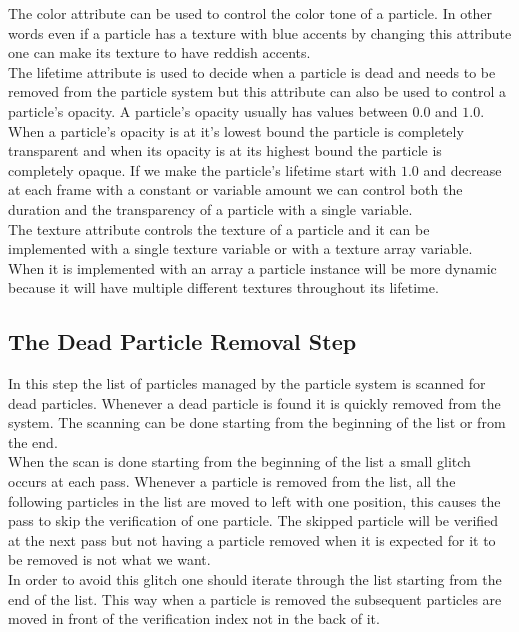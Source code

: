 The color attribute can be used to control the color tone of a particle. In other words even if a particle has a texture with blue accents by changing this attribute one can make its texture to have reddish accents.\\

The lifetime attribute is used to decide when a particle is dead and needs to be removed from the particle system but this attribute can also be used to control a particle's opacity. A particle's opacity usually has values between $0.0$ and $1.0$. When a particle's opacity is at it's lowest bound the particle is completely transparent and when its opacity is at its highest bound the particle is completely opaque. If we make the particle's lifetime start with $1.0$ and decrease at each frame with a constant or variable amount we can control both the duration and the transparency of a particle with a single variable.\\

The texture attribute controls the texture of a particle and it can be implemented with a single texture variable or with a texture array variable. When it is implemented with an array a particle instance will be more dynamic because it will have multiple different textures throughout its lifetime.\\

\newpage
\subsection{The Dead Particle Removal Step}
In this step the list of particles managed by the particle system is scanned for dead particles. Whenever a dead particle is found it is quickly removed from the system. The scanning can be done starting from the beginning of the list or from the end.\\

When the scan is done starting from the beginning of the list a small glitch occurs at each pass. Whenever a particle is removed from the list, all the following particles in the list are moved to left with one position, this causes the pass to skip the verification of one particle. The skipped particle will be verified at the next pass but not having a particle removed when it is expected for it to be removed is not what we want.\\

In order to avoid this glitch one should iterate through the list starting from the end of the list. This way when a particle is removed the subsequent particles are moved in front of the verification index not in the back of it.\\

